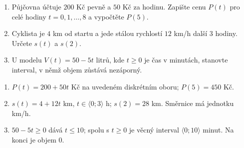 \documentclass[11pt,a4paper]{article}
\begin{document}
\begin{zadaniReseniBox}
\begin{enumerate}[label=\alph*)]
\item Půjčovna účtuje $200$ Kč pevně a $50$ Kč za hodinu. Zapište cenu $P(t)$ pro celé hodiny $t=0,1,\ldots,8$ a vypočtěte $P(5)$.
\item Cyklista je $4$ km od startu a jede stálou rychlostí $12$ km/h další $3$ hodiny. Určete $s(t)$ a $s(2)$.
\item U modelu $V(t)=50-5t$ litrů, kde $t\ge0$ je čas v minutách, stanovte interval, v němž objem zůstává nezáporný.
\end{enumerate}
\tcblower
\begin{enumerate}[label=\alph*)]
\item $P(t)=200+50t$ Kč na uvedeném diskrétním oboru; $P(5)=450$ Kč.
\item $s(t)=4+12t$ km, $t\in\langle0;3\rangle$ h; $s(2)=28$ km. Směrnice má jednotku km/h.
\item $50-5t\ge0$ dává $t\le10$; spolu s $t\ge0$ je věcný interval $\langle0;10\rangle$ minut. Na konci je objem $0$.
\end{enumerate}
\end{zadaniReseniBox}
\end{document}
